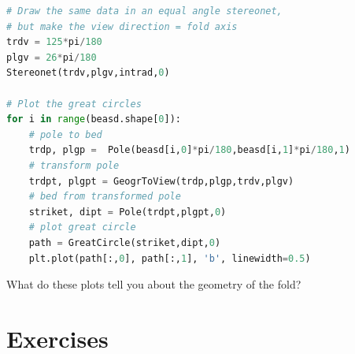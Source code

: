\documentclass[a4paper , 12pt]{book}
\begin{document}
\begin{center}
\begin{lstlisting}[language=Python, frame=single]
# Draw the same data in an equal angle stereonet,
# but make the view direction = fold axis
trdv = 125*pi/180
plgv = 26*pi/180
Stereonet(trdv,plgv,intrad,0)

# Plot the great circles
for i in range(beasd.shape[0]):
    # pole to bed
    trdp, plgp =  Pole(beasd[i,0]*pi/180,beasd[i,1]*pi/180,1)
    # transform pole
    trdpt, plgpt = GeogrToView(trdp,plgp,trdv,plgv)
    # bed from transformed pole
    striket, dipt = Pole(trdpt,plgpt,0)
    # plot great circle
    path = GreatCircle(striket,dipt,0)
    plt.plot(path[:,0], path[:,1], 'b', linewidth=0.5)  
\end{lstlisting}
\end{center}

What do these plots tell you about the geometry of the fold?

\section{Exercises}
\end{document}
